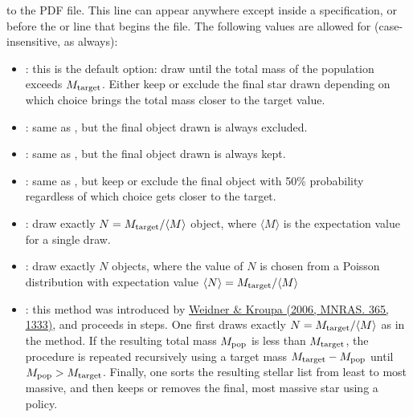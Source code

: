 \documentclass[letterpaper,10pt,english]{sphinxmanual}
\begin{document}
to the PDF file. This line can appear anywhere except inside a  specification, or before the  or  line that begins the file. The following values are allowed for  (case-insensitive, as always):
\begin{itemize}
\item {} 
: this is the default option: draw until the total mass of the population exceeds \(M_{\rm target}\). Either keep or exclude the final star drawn depending on which choice brings the total mass closer to the target value.

\item {} 
: same as , but the final object drawn is always excluded.

\item {} 
: same as , but the final object drawn is always kept.

\item {} 
: same as , but keep or exclude the final object with 50\% probability regardless of which choice gets closer to the target.

\item {} 
: draw exactly \(N = M_{\rm target}/\langle M\rangle\) object, where \(\langle M\rangle\) is the expectation value for a single draw.

\item {} 
: draw exactly \(N\) objects, where the value of \(N\) is chosen from a Poisson distribution with expectation value \(\langle N \rangle = M_{\rm target}/\langle M\rangle\)

\item {} 
: this method was introduced by \href{http://adsabs.harvard.edu/abs/2006MNRAS.365.1333W}{Weidner \& Kroupa (2006, MNRAS. 365, 1333)}, and proceeds in steps. One first draws exactly \(N= M_{\rm target}/\langle M\rangle\) as in the  method. If the resulting total mass \(M_{\rm pop}\) is less than \(M_{\rm target}\), the procedure is repeated recursively using a target mass \(M_{\rm target} - M_{\rm pop}\) until \(M_{\rm pop} > M_{\rm target}\). Finally, one sorts the resulting stellar list from least to most massive, and then keeps or removes the final, most massive star using a  policy.

\end{itemize}
\end{document}
